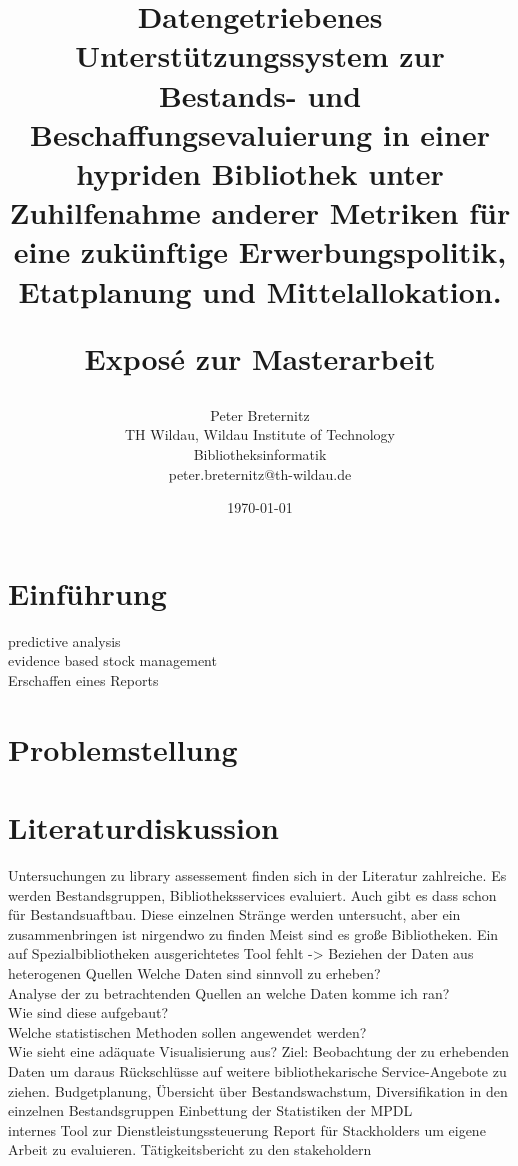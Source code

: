 \documentclass[10pt,a4paper,twocolumn,conference]{IEEEtran}
\begin{document}
\nocite{*}
\title{{\bf Datengetriebenes Unterstützungssystem zur Bestands- und Beschaffungsevaluierung in einer hypriden Bibliothek unter Zuhilfenahme anderer Metriken für eine zukünftige Erwerbungspolitik, Etatplanung und Mittelallokation.} \\ 
    \begin{large}
        Exposé zur Masterarbeit                                                                             
    \end{large}}
\author{
	Peter Breternitz \\
	TH Wildau, Wildau Institute of Technology\\ Bibliotheksinformatik \\
	peter.breternitz@th-wildau.de
}


\date{\today}

\maketitle

\section{Einführung}
predictive analysis\\
evidence based stock management\\

Erschaffen eines Reports

\section{Problemstellung}
\blindtext
\section{Literaturdiskussion}
\blindtext
Untersuchungen zu library assessement finden sich in der Literatur zahlreiche.
Es werden Bestandsgruppen, Bibliotheksservices evaluiert. Auch gibt es dass
schon für Bestandsuaftbau. Diese einzelnen Stränge werden untersucht, aber ein
zusammenbringen ist nirgendwo zu finden
Meist sind es große Bibliotheken. Ein auf Spezialbibliotheken ausgerichtetes
Tool fehlt -> Beziehen der Daten aus heterogenen Quellen
Welche Daten sind sinnvoll zu erheben?\\
Analyse der zu betrachtenden Quellen an welche Daten komme ich ran?\\
Wie sind diese aufgebaut?\\
Welche statistischen Methoden sollen angewendet werden?\\
Wie sieht eine adäquate Visualisierung aus?
Ziel: Beobachtung der zu erhebenden Daten um daraus Rückschlüsse auf weitere
bibliothekarische Service-Angebote zu ziehen. Budgetplanung, Übersicht über
Bestandswachstum, Diversifikation in den einzelnen Bestandsgruppen
Einbettung der Statistiken der MPDL\\
internes Tool zur Dienstleistungssteuerung
Report für Stackholders
um eigene Arbeit zu evaluieren.
Tätigkeitsbericht zu den stakeholdern
\end{document}

